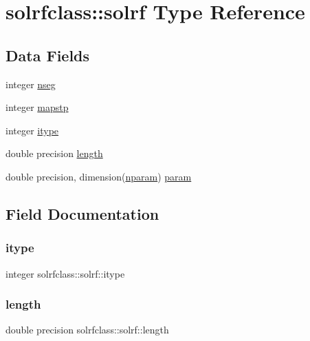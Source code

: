 \hypertarget{structsolrfclass_1_1solrf}{}\section{solrfclass\+::solrf Type Reference}
\label{structsolrfclass_1_1solrf}
\subsection*{Data Fields}
\begin{DoxyCompactItemize}
\item 
integer \mbox{\hyperlink{structsolrfclass_1_1solrf_a1825472ba9b6dfe1d7ca72bfc85f0532}{nseg}}
\item 
integer \mbox{\hyperlink{structsolrfclass_1_1solrf_af5533539dedb70fb85e93b1a76a7a55d}{mapstp}}
\item 
integer \mbox{\hyperlink{structsolrfclass_1_1solrf_af3ec222ea47a2e9d6dea703d94927750}{itype}}
\item 
double precision \mbox{\hyperlink{structsolrfclass_1_1solrf_a6fbb4ce6f8918840cadf9ee8e16769f9}{length}}
\item 
double precision, dimension(\mbox{\hyperlink{namespacesolrfclass_a01b965e25069cff9fb1797fbbcb9939d}{nparam}}) \mbox{\hyperlink{structsolrfclass_1_1solrf_a10deafd1e7cbd79c86c62766f73105f9}{param}}
\end{DoxyCompactItemize}


\subsection{Field Documentation}
\mbox{\label{structsolrfclass_1_1solrf_af3ec222ea47a2e9d6dea703d94927750}} 
\subsubsection{\texorpdfstring{itype}{itype}}
{\footnotesize\ttfamily integer solrfclass\+::solrf\+::itype}

\mbox{\label{structsolrfclass_1_1solrf_a6fbb4ce6f8918840cadf9ee8e16769f9}} 
\subsubsection{\texorpdfstring{length}{length}}
{\footnotesize\ttfamily double precision solrfclass\+::solrf\+::length}

